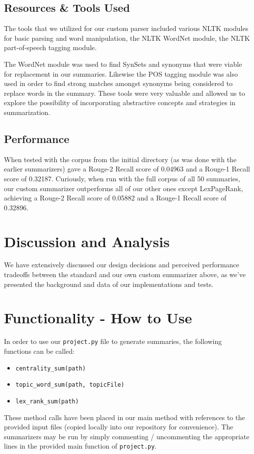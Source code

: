 \documentclass[11pt,letterpaper]{article}
\begin{document}
\subsection{Resources \& Tools Used}
The tools that we utilized for our custom parser included various NLTK modules for basic parsing and word manipulation, the NLTK WordNet module, the NLTK part-of-speech tagging module.

The WordNet module was used to find SynSets and synonyms that were viable for replacement in our summaries. Likewise the POS tagging module was also used in order to find strong matches amongst synonyms being considered to replace words in the summary. These tools were very valuable and allowed us to explore the possibility of incorporating abstractive concepts and strategies in summarization.

\subsection{Performance}
When tested with the corpus from the initial directory (as was done with the earlier summarizers) gave a Rouge-2 Recall score of 0.04963 and a Rouge-1 Recall score of 0.32187. Curiously, when run with the full corpus of all 50 summaries, our custom summarizer outperforms all of our other ones except LexPageRank, achieving a Rouge-2 Recall score of 0.05882 and a Rouge-1 Recall score of 0.32896.

\section{Discussion and Analysis}
We have extensively discussed our design decisions and perceived performance tradeoffs between the standard and our own custom summarizer above, as we've presented the background and data of our implementations and tests.

\section{Functionality - How to Use}
In order to use our {\tt project.py} file to generate summaries, the following functions can be called:
\begin{itemize}
\item {\tt centrality\_sum(path)}
\item {\tt topic\_word\_sum(path, topicFile)}
\item {\tt lex\_rank\_sum(path)}
\end{itemize}

These method calls have been placed in our main method with references to the provided input files (copied locally into our repository for convenience). The summarizers may be run by simply commenting / uncommenting the appropriate lines in the provided main function of {\tt project.py}.
\end{document}
